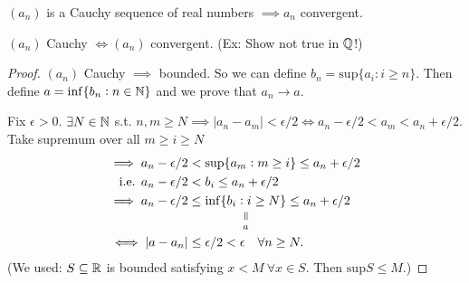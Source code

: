 \documentclass[twoside]{scrartcl}
\begin{document}
\begin{theorem}
$(a_n)$ is a Cauchy sequence of real numbers $\implies a_n$ convergent. 
\end{theorem}

\begin{corollary}
$(a_n)$ Cauchy $\iff (a_n)$ convergent. (Ex: Show not true in $\mathbb{Q}$!) 	
\end{corollary}

\begin{proof}
$(a_n)$ Cauchy $\implies$ bounded. So we can define $b_n = \mathrm{sup}\{a_i : i \geq n\}$. Then define $a = \mathrm{inf}\{b_n : n \in\mathbb{N}\}$ and we prove that $a_n \to a$.

Fix $\epsilon > 0$. $\exists N \in\mathbb{N}$ s.t. $n,m \geq N  \implies |a_n - a_m| < \epsilon/2 \iff a_n - \epsilon/2 < a_m < a_n + \epsilon /2$.
Take supremum over all $m \geq i \geq N$
\[\begin{aligned}
\implies a_n - \epsilon/2 &< \mathrm{sup}	\{a_m: m \geq i\} \leq a_n + \epsilon/2\\
\text{ i.e. } a_n - \epsilon/2 &< b_i \leq a_n + \epsilon/2\\
\implies a_n - \epsilon/2 &\leq \equalto{\mathrm{inf}	\{b_i: i \geq N\}}{a} \leq a_n + \epsilon/2\\
\iff |a-a_n| &\leq \epsilon/2 < \epsilon \quad \forall n \geq N.\end{aligned}\]
(We used: $S \subseteq \mathbb{R}$ is bounded satisfying $x < M~\forall x \in S$. Then $\mathrm{sup}S \leq M$.)
\end{proof}

\pagebreak
{}
\end{document}
